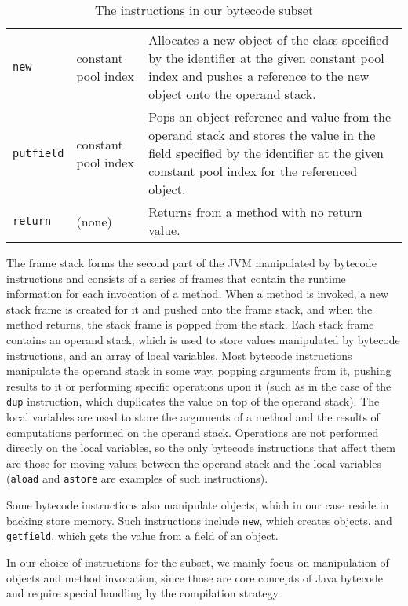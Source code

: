 \begin{table}
\begin{tabular}{llp{8cm}}
    \\
    \texttt{new} & constant pool index &
    Allocates a new object of the class specified by the identifier at
    the given constant pool index and pushes a reference to the new
    object onto the operand stack.
    \\
    \texttt{putfield} & constant pool index &
    Pops an object reference and value from the operand stack and
    stores the value in the field specified by the identifier at the
    given constant pool index for the referenced object.
    \\
    \texttt{return} & (none) &
    Returns from a method with no return value.
    \\
    \hline
  \end{tabular}
  \caption{The instructions in our bytecode subset}
  \label{bytecode-subset-table}
\end{table}

The frame stack forms the second part of the JVM manipulated by
bytecode instructions and consists of a series of frames that contain
the runtime information for each invocation of a method.
When a method is invoked, a new stack frame is created for it and
pushed onto the frame stack, and when the method returns, the stack
frame is popped from the stack.
Each stack frame contains an operand stack, which is used to store
values manipulated by bytecode instructions, and an array of local
variables.
Most bytecode instructions manipulate the operand stack in some way,
popping arguments from it, pushing results to it or performing
specific operations upon it (such as in the case of the \texttt{dup}
instruction, which duplicates the value on top of the operand stack).
The local variables are used to store the arguments of a method and
the results of computations performed on the operand stack.
Operations are not performed directly on the local variables, so the
only bytecode instructions that affect them are those for moving
values between the operand stack and the local variables
(\texttt{aload} and \texttt{astore} are examples of such
instructions).

Some bytecode instructions also manipulate objects, which in our case
reside in backing store memory.
Such instructions include \texttt{new}, which creates objects, and
\texttt{getfield}, which gets the value from a field of an object.

In our choice of instructions for the subset, we mainly focus on
manipulation of objects and method invocation, since those are core
concepts of Java bytecode and require special handling by the
compilation strategy.

